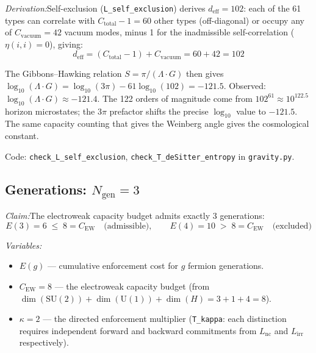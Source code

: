 \documentclass[11pt]{article}
\newcommand{\Ctot}{C_{\mathrm{total}}}
\newcommand{\deff}{d_{\mathrm{eff}}}
\newcommand{\LG}{\Lambda \cdot G}
\newcommand{\Lnc}{L_{\mathrm{nc}}}
\newcommand{\Lirr}{L_{\mathrm{irr}}}
\newcommand{\SU}{\mathrm{SU}}
\newcommand{\U}{\mathrm{U}}
\begin{document}
\textit{Derivation:}\quad Self-exclusion (\texttt{L\_self\_exclusion}) derives $\deff = 102$: each of the 61 types can correlate with $\Ctot - 1 = 60$ other types (off-diagonal) or occupy any of $C_{\mathrm{vacuum}} = 42$ vacuum modes, minus 1 for the inadmissible self-correlation ($\eta(i,i) = 0$), giving:
\begin{equation}
\deff = (\Ctot - 1) + C_{\mathrm{vacuum}} = 60 + 42 = 102
\end{equation}

The Gibbons--Hawking relation $S = \pi/(\LG)$ then gives $\log_{10}(\LG) = \log_{10}(3\pi) - 61\log_{10}(102) = -121.5$.  Observed: $\log_{10}(\LG) \approx -121.4$.  The 122 orders of magnitude come from $102^{61} \approx 10^{122.5}$ horizon microstates; the $3\pi$ prefactor shifts the precise $\log_{10}$ value to $-121.5$.  The same capacity counting that gives the Weinberg angle gives the cosmological constant.

Code: \texttt{check\_L\_self\_exclusion}, \texttt{check\_T\_deSitter\_entropy} in \texttt{gravity.py}.


\subsection{Generations: \texorpdfstring{$N_{\mathrm{gen}} = 3$}{Ngen = 3}}

\begin{tcolorbox}[apfbox, title={T4F: Generation Count from Electroweak Capacity Saturation}]
\textit{Claim:}\quad The electroweak capacity budget admits exactly 3 generations:
\begin{equation}
E(3) = 6 \;\le\; 8 = C_{\mathrm{EW}} \quad\text{(admissible)}, \qquad E(4) = 10 \;>\; 8 = C_{\mathrm{EW}} \quad\text{(excluded)}
\end{equation}

\smallskip\noindent\textit{Variables:}
\begin{itemize}[nosep,leftmargin=2em]
\item $E(g)$ --- cumulative enforcement cost for $g$ fermion generations.
\item $C_{\mathrm{EW}} = 8$ --- the electroweak capacity budget (from $\dim(\SU(2)) + \dim(\U(1)) + \dim(H) = 3 + 1 + 4 = 8$).
\item $\kappa = 2$ --- the directed enforcement multiplier (\texttt{T\_kappa}: each distinction requires independent forward and backward commitments from $\Lnc$ and $\Lirr$ respectively).
\end{itemize}
\end{tcolorbox}
\end{document}
